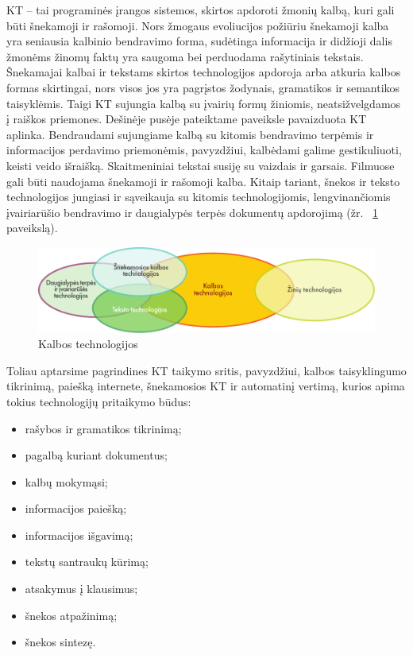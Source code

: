 
\begin{multicols}{2}

KT – tai programinės įrangos sistemos, skirtos apdoroti žmonių kalbą, kuri gali būti šnekamoji ir rašomoji. Nors žmogaus evoliucijos požiūriu šnekamoji kalba yra seniausia kalbinio bendravimo forma, sudėtinga informacija ir didžioji dalis žmonėms žinomų faktų yra saugoma bei perduodama rašytiniais tekstais. Šnekamajai kalbai ir tekstams skirtos technologijos apdoroja arba atkuria kalbos formas skirtingai, nors visos jos yra pagrįstos žodynais, gramatikos ir semantikos taisyklėmis. Taigi KT sujungia kalbą su įvairių formų žiniomis, neatsižvelgdamos į raiškos priemones. Dešinėje pusėje pateiktame paveiksle pavaizduota KT aplinka. Bendraudami sujungiame kalbą su kitomis bendravimo terpėmis ir informacijos perdavimo priemonėmis, pavyzdžiui, kalbėdami galime gestikuliuoti, keisti veido išraišką. Skaitmeniniai tekstai susiję su  vaizdais ir garsais. Filmuose gali būti naudojama šnekamoji ir rašomoji kalba. Kitaip tariant, šnekos ir teksto technologijos jungiasi ir sąveikauja su kitomis technologijomis, lengvinančiomis įvairiarūšio bendravimo ir daugialypės terpės dokumentų apdorojimą (žr. ~\ref{fig:ltincontext_de} paveikslą).

\begin{figure}[htb]
  \center
  \includegraphics[width=\textwidth]{../_media/lithuanian/language_technologies}
  \caption{Kalbos technologijos}
  \label{fig:ltincontext_de}
\end{figure}

Toliau aptarsime pagrindines KT taikymo sritis, pavyzdžiui, kalbos taisyklingumo tikrinimą, paiešką internete, šnekamosios KT ir automatinį vertimą, kurios apima tokius technologijų pritaikymo būdus:

\begin{itemize}
\item  rašybos ir gramatikos tikrinimą;
\item pagalbą kuriant dokumentus;
\item kalbų mokymąsi;
\item  informacijos paiešką;
\item  informacijos išgavimą;
\item tekstų santraukų kūrimą;
\item atsakymus į klausimus;
\item šnekos atpažinimą; 
\item  šnekos sintezę.
\end{itemize}


\end{multicols}
